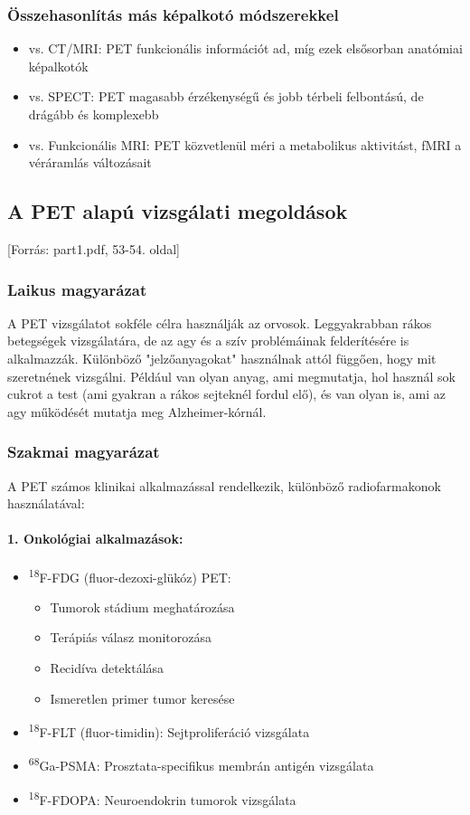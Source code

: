 \documentclass[a4paper,12pt]{article}
\begin{document}
\subsubsection{Összehasonlítás más képalkotó módszerekkel} \begin{itemize} \item vs. CT/MRI: PET funkcionális információt ad, míg ezek elsősorban anatómiai képalkotók \item vs. SPECT: PET magasabb érzékenységű és jobb térbeli felbontású, de drágább és komplexebb \item vs. Funkcionális MRI: PET közvetlenül méri a metabolikus aktivitást, fMRI a véráramlás változásait \end{itemize}

\subsection{A PET alapú vizsgálati megoldások} [Forrás: part1.pdf, 53-54. oldal]

\subsubsection{Laikus magyarázat} A PET vizsgálatot sokféle célra használják az orvosok. Leggyakrabban rákos betegségek vizsgálatára, de az agy és a szív problémáinak felderítésére is alkalmazzák. Különböző "jelzőanyagokat" használnak attól függően, hogy mit szeretnének vizsgálni. Például van olyan anyag, ami megmutatja, hol használ sok cukrot a test (ami gyakran a rákos sejteknél fordul elő), és van olyan is, ami az agy működését mutatja meg Alzheimer-kórnál.

\subsubsection{Szakmai magyarázat} A PET számos klinikai alkalmazással rendelkezik, különböző radiofarmakonok használatával:

\paragraph{1. Onkológiai alkalmazások:} \begin{itemize} \item \textsuperscript{18}F-FDG (fluor-dezoxi-glükóz) PET: \begin{itemize} \item Tumorok stádium meghatározása \item Terápiás válasz monitorozása \item Recidíva detektálása \item Ismeretlen primer tumor keresése \end{itemize} \item \textsuperscript{18}F-FLT (fluor-timidin): Sejtproliferáció vizsgálata \item \textsuperscript{68}Ga-PSMA: Prosztata-specifikus membrán antigén vizsgálata \item \textsuperscript{18}F-FDOPA: Neuroendokrin tumorok vizsgálata \end{itemize}
\end{document}
